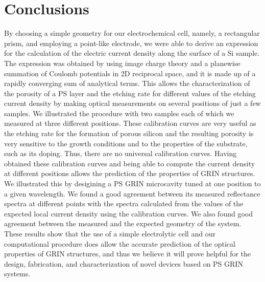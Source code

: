 \documentclass{article}
\begin{document}
\section{Conclusions}
\label{sec:conclusion}
By choosing a simple geometry for our electrochemical cell, namely, a
rectangular prism, and employing a point-like electrode, we were able
to derive an expression for the calculation of the electric current
density along the surface of a Si sample. The expression was obtained
by using image charge theory and a planewise summation of Coulomb
potentials in 2D reciprocal space, and it is made up of
a rapidly converging sum of analytical terms. This allows the characterization
of the porosity of a PS layer and the etching
rate for different values of the etching current density by making
optical measurements on several positions of just a
few samples. We illustrated the procedure with two samples each of which we
measured at three different positions. These calibration curves are
very useful as the etching rate for the formation of porous silicon
and the resulting porosity is very sensitive to the growth conditions
and to the properties of the substrate, such as its doping. Thus,
there are no universal calibration curves. Having obtained these calibration curves
and being able to compute the current density at different positions
allows the prediction of the properties of GRIN structures. We
illustrated this by desigining a PS GRIN microcavity tuned at one
position to a given wavelength. We found a good agreement between its
measured reflectance spectra at different points with the spectra
calculated from the values of the expected local current
density using the calibration curves. We also found good agreement
between the measured and the expected geometry of the system. These
results show that the use of a simple electrolytic cell and our
computational procedure does allow the accurate prediction of the
optical properties of GRIN structures, and thus we believe it will
prove helpful for the design, fabrication, and characterization of novel
devices based on PS GRIN systems.
\end{document}

